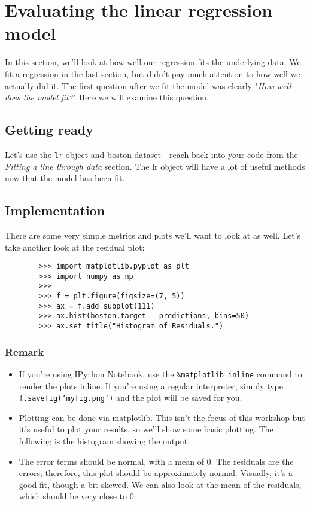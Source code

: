 \documentclass[SKL-MASTER.tex]{subfiles}
\begin{document}
	\Large
	\section*{Evaluating the linear regression model}
	In this section, we'll look at how well our regression fits the underlying data. We fit a regression
	in the last section, but didn't pay much attention to how well we actually did it. The first question
	after we fit the model was clearly "\textit{How well does the model fit?}" Here we will examine
	this question.
	\subsection*{Getting ready}
	Let's use the \texttt{lr} object and boston dataset—reach back into your code from the \textit{Fitting a line
		through data} section. The lr object will have a lot of useful methods now that the model has
	been fit.
	\subsection*{Implementation}
	There are some very simple metrics and plots we'll want to look at as well. Let's take another
	look at the residual plot:
	
	\begin{framed}
		\begin{verbatim}
		>>> import matplotlib.pyplot as plt
		>>> import numpy as np
		>>>
		>>> f = plt.figure(figsize=(7, 5))
		>>> ax = f.add_subplot(111)
		>>> ax.hist(boston.target - predictions, bins=50)
		>>> ax.set_title("Histogram of Residuals.")
		\end{verbatim}
	\end{framed}
	\subsubsection*{Remark}
	\begin{itemize}
		\item If you're using IPython Notebook, use the \texttt{\%matplotlib inline} command to render the
		plots inline. If you're using a regular interpreter, simply type \texttt{f.savefig('myfig.png')}
		and the plot will be saved for you.
		
		\item Plotting can be done via matplotlib. This isn't the focus of this workshop
		but it's useful to plot your results, so we'll show some basic plotting.
		The following is the histogram showing the output:
		
		\item The error terms should be normal, with a mean of 0. The residuals
		are the errors; therefore, this plot should be approximately normal. Visually, it's a good fit, though
		a bit skewed. We can also look at the mean of the residuals, which should be very close to 0:
	\end{itemize}
	
\end{document}
